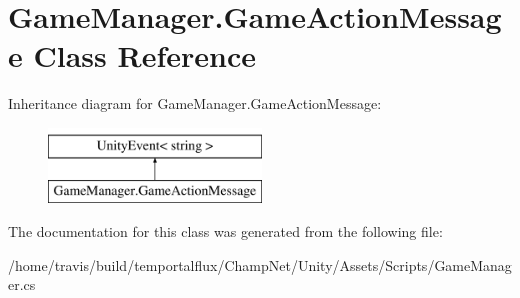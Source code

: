 \hypertarget{class_game_manager_1_1_game_action_message}{\section{Game\-Manager.\-Game\-Action\-Message Class Reference}
\label{class_game_manager_1_1_game_action_message}
}
Inheritance diagram for Game\-Manager.\-Game\-Action\-Message\-:\begin{figure}[H]
\begin{center}
\leavevmode
\includegraphics[height=2.000000cm]{class_game_manager_1_1_game_action_message}
\end{center}
\end{figure}


The documentation for this class was generated from the following file\-:\begin{DoxyCompactItemize}
\item 
/home/travis/build/temportalflux/\-Champ\-Net/\-Unity/\-Assets/\-Scripts/Game\-Manager.\-cs\end{DoxyCompactItemize}
